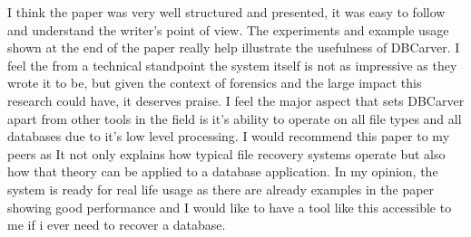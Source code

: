 \documentclass[11pt,]{article}
\begin{document}
I think the paper was very well structured and presented, it was easy to
follow and understand the writer's point of view. The experiments and
example usage shown at the end of the paper really help illustrate the
usefulness of DBCarver. I feel the from a technical standpoint the
system itself is not as impressive as they wrote it to be, but given the
context of forensics and the large impact this research could have, it
deserves praise. I feel the major aspect that sets DBCarver apart from
other tools in the field is it's ability to operate on all file types
and all databases due to it's low level processing. I would recommend
this paper to my peers as It not only explains how typical file recovery
systems operate but also how that theory can be applied to a database
application. In my opinion, the system is ready for real life usage as
there are already examples in the paper showing good performance and I
would like to have a tool like this accessible to me if i ever need to
recover a database.

\printbibliography
\end{document}

